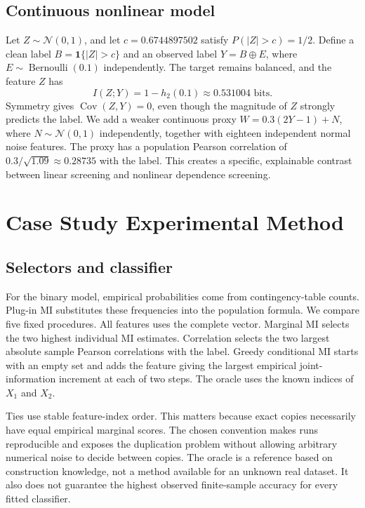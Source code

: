 \documentclass[journal,11pt]{IEEEtran}
\begin{document}
\subsection{Continuous nonlinear model}
Let $Z\sim\mathcal N(0,1)$, and let $c=0.6744897502$ satisfy $P(|Z|>c)=1/2$. Define a clean label $B=\mathbf1\{|Z|>c\}$ and an observed label $Y=B\oplus E$, where $E\sim\operatorname{Bernoulli}(0.1)$ independently. The target remains balanced, and the feature $Z$ has
\begin{equation}
I(Z;Y)=1-h_2(0.1)\approx0.531004\text{ bits}.
\end{equation}
Symmetry gives $\operatorname{Cov}(Z,Y)=0$, even though the magnitude of $Z$ strongly predicts the label. We add a weaker continuous proxy $W=0.3(2Y-1)+N$, where $N\sim\mathcal N(0,1)$ independently, together with eighteen independent normal noise features. The proxy has a population Pearson correlation of $0.3/\sqrt{1.09}\approx0.28735$ with the label. This creates a specific, explainable contrast between linear screening and nonlinear dependence screening.

\section{Case Study Experimental Method}
\subsection{Selectors and classifier}
For the binary model, empirical probabilities come from contingency-table counts. Plug-in MI substitutes these frequencies into the population formula. We compare five fixed procedures. All features uses the complete vector. Marginal MI selects the two highest individual MI estimates. Correlation selects the two largest absolute sample Pearson correlations with the label. Greedy conditional MI starts with an empty set and adds the feature giving the largest empirical joint-information increment at each of two steps. The oracle uses the known indices of $X_1$ and $X_2$.

Ties use stable feature-index order. This matters because exact copies necessarily have equal empirical marginal scores. The chosen convention makes runs reproducible and exposes the duplication problem without allowing arbitrary numerical noise to decide between copies. The oracle is a reference based on construction knowledge, not a method available for an unknown real dataset. It also does not guarantee the highest observed finite-sample accuracy for every fitted classifier.
\end{document}
